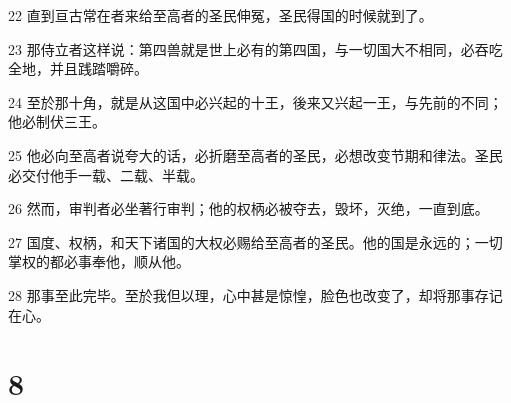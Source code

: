 \par 22 直到亘古常在者来给至高者的圣民伸冤，圣民得国的时候就到了。
\par 23 那侍立者这样说：第四兽就是世上必有的第四国，与一切国大不相同，必吞吃全地，并且践踏嚼碎。
\par 24 至於那十角，就是从这国中必兴起的十王，後来又兴起一王，与先前的不同；他必制伏三王。
\par 25 他必向至高者说夸大的话，必折磨至高者的圣民，必想改变节期和律法。圣民必交付他手一载、二载、半载。
\par 26 然而，审判者必坐著行审判；他的权柄必被夺去，毁坏，灭绝，一直到底。
\par 27 国度、权柄，和天下诸国的大权必赐给至高者的圣民。他的国是永远的；一切掌权的都必事奉他，顺从他。
\par 28 那事至此完毕。至於我但以理，心中甚是惊惶，脸色也改变了，却将那事存记在心。

\chapter{8}

